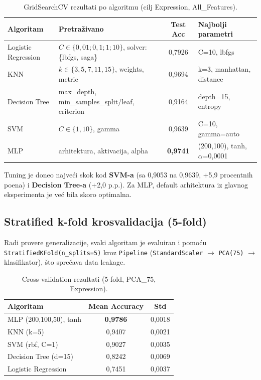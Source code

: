 \documentclass[12pt,a4paper]{article}
\begin{document}
\begin{table}[H]
\centering
\small
\begin{tabular}{lp{4.5cm}cl}
\toprule
\textbf{Algoritam} & \textbf{Pretraživano} & \textbf{Test Acc} & \textbf{Najbolji parametri} \\
\midrule
Logistic Regression & $C \in \{0{,}01; 0{,}1; 1; 10\}$, solver: \{lbfgs, saga\} & 0,7926 & C=10, lbfgs \\
KNN & $k \in \{3,5,7,11,15\}$, weights, metric & 0,9694 & k=3, manhattan, distance \\
Decision Tree & max\_depth, min\_samples\_split/leaf, criterion & 0,9164 & depth=15, entropy \\
SVM & $C \in \{1, 10\}$, gamma & 0,9639 & C=10, gamma=auto \\
MLP & arhitektura, aktivacija, alpha & \textbf{0,9741} & (200,100), tanh, $\alpha$=0{,}0001 \\
\bottomrule
\end{tabular}
\caption{GridSearchCV rezultati po algoritmu (cilj Expression, All\_Features).}
\end{table}

Tuning je doneo najveći skok kod \textbf{SVM-a} (sa 0{,}9053 na 0{,}9639, +5{,}9 procentnih poena) i \textbf{Decision Tree-a} (+2{,}0 p.p.). Za MLP, default arhitektura iz glavnog eksperimenta je već bila skoro optimalna.

\subsection{Stratified k-fold krosvalidacija (5-fold)}

Radi provere generalizacije, svaki algoritam je evaluiran i pomoću \texttt{StratifiedKFold(n\_splits=5)} kroz \texttt{Pipeline} (\texttt{StandardScaler} $\to$ \texttt{PCA(75)} $\to$ klasifikator), što sprečava data leakage.

\begin{table}[H]
\centering
\begin{tabular}{lcc}
\toprule
\textbf{Algoritam} & \textbf{Mean Accuracy} & \textbf{Std} \\
\midrule
MLP (200,100,50), tanh & \textbf{0,9786} & 0,0018 \\
KNN (k=5)              & 0,9407 & 0,0021 \\
SVM (rbf, C=1)         & 0,9027 & 0,0035 \\
Decision Tree (d=15)   & 0,8242 & 0,0069 \\
Logistic Regression    & 0,7451 & 0,0037 \\
\bottomrule
\end{tabular}
\caption{Cross-validation rezultati (5-fold, PCA\_75, Expression).}
\end{table}
\end{document}
